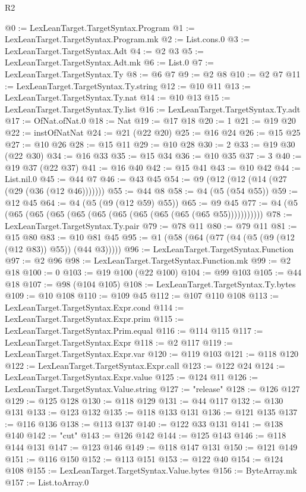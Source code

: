\begin{lexlean}{R2}
\begin{coremodule}
@0 := LexLeanTarget.TargetSyntax.Program
@1 := LexLeanTarget.TargetSyntax.Program.mk
@2 := List.cons.{0}
@3 := LexLeanTarget.TargetSyntax.Adt
@4 := @2 @3
@5 := LexLeanTarget.TargetSyntax.Adt.mk
@6 := List.{0}
@7 := LexLeanTarget.TargetSyntax.Ty
@8 := @6 @7
@9 := @2 @8
@10 := @2 @7
@11 := LexLeanTarget.TargetSyntax.Ty.string
@12 := @10 @11
@13 := LexLeanTarget.TargetSyntax.Ty.nat
@14 := @10 @13
@15 := LexLeanTarget.TargetSyntax.Ty.list
@16 := LexLeanTarget.TargetSyntax.Ty.adt
@17 := OfNat.ofNat.{0}
@18 := Nat
@19 := @17 @18
@20 := 1
@21 := @19 @20
@22 := instOfNatNat
@24 := @21 (@22 @20)
@25 := @16 @24
@26 := @15 @25
@27 := @10 @26
@28 := @15 @11
@29 := @10 @28
@30 := 2
@33 := @19 @30 (@22 @30)
@34 := @16 @33
@35 := @15 @34
@36 := @10 @35
@37 := 3
@40 := @19 @37 (@22 @37)
@41 := @16 @40
@42 := @15 @41
@43 := @10 @42
@44 := List.nil.{0}
@45 := @44 @7
@46 := @43 @45
@54 := @9 (@12 (@12 (@14 (@27 (@29 (@36 (@12 @46)))))))
@55 := @44 @8
@58 := @4 (@5 (@54 @55))
@59 := @12 @45
@64 := @4 (@5 (@9 (@12 @59) @55))
@65 := @9 @45
@77 := @4 (@5 (@65 (@65 (@65 (@65 (@65 (@65 (@65 (@65 (@65 (@65 @55)))))))))))
@78 := LexLeanTarget.TargetSyntax.Ty.pair
@79 := @78 @11
@80 := @79 @11
@81 := @15 @80
@83 := @10 @81 @45
@95 := @1 (@58 (@64 (@77 (@4 (@5 (@9 (@12 (@12 @83)) @55)) (@44 @3)))))
@96 := LexLeanTarget.TargetSyntax.Function
@97 := @2 @96
@98 := LexLeanTarget.TargetSyntax.Function.mk
@99 := @2 @18
@100 := 0
@103 := @19 @100 (@22 @100)
@104 := @99 @103
@105 := @44 @18
@107 := @98 (@104 @105)
@108 := LexLeanTarget.TargetSyntax.Ty.bytes
@109 := @10 @108
@110 := @109 @45
@112 := @107 @110 @108
@113 := LexLeanTarget.TargetSyntax.Expr.cond
@114 := LexLeanTarget.TargetSyntax.Expr.prim
@115 := LexLeanTarget.TargetSyntax.Prim.equal
@116 := @114 @115
@117 := LexLeanTarget.TargetSyntax.Expr
@118 := @2 @117
@119 := LexLeanTarget.TargetSyntax.Expr.var
@120 := @119 @103
@121 := @118 @120
@122 := LexLeanTarget.TargetSyntax.Expr.call
@123 := @122 @24
@124 := LexLeanTarget.TargetSyntax.Expr.value
@125 := @124 @11
@126 := LexLeanTarget.TargetSyntax.Value.string
@127 := "release"
@128 := @126 @127
@129 := @125 @128
@130 := @118 @129
@131 := @44 @117
@132 := @130 @131
@133 := @123 @132
@135 := @118 @133 @131
@136 := @121 @135
@137 := @116 @136
@138 := @113 @137
@140 := @122 @33 @131
@141 := @138 @140
@142 := "cut"
@143 := @126 @142
@144 := @125 @143
@146 := @118 @144 @131
@147 := @123 @146
@149 := @118 @147 @131
@150 := @121 @149
@151 := @116 @150
@152 := @113 @151
@153 := @122 @40
@154 := @124 @108
@155 := LexLeanTarget.TargetSyntax.Value.bytes
@156 := ByteArray.mk
@157 := List.toArray.{0}

\end{coremodule}
\end{lexlean}
